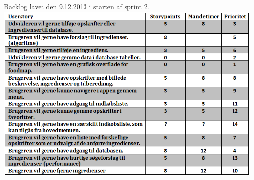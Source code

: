 Backlog lavet den 9.12.2013 i starten af sprint 2. \\
\includegraphics[scale=0.60]{includes/billeder/productbacklog_sprint2.png}